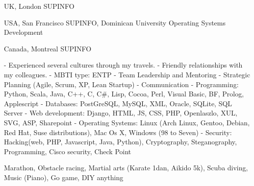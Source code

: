\documentclass[english]{ecv}
\makeatletter
\renewcommand{\ecvBSec}[2][\ecv@lang]{%
  \ifthenelse{\equal{#1}{\ecv@lang}}{%
    \tabularnewline%
    \ecvLeft{\textsc{\Large{\textcolor{ecv@ColBlue}{#2}}} \medskip } &%
    \tabularnewline%
  }{}%
}
\makeatother
\begin{document}
\begin{ecv}
 {UK, London}
                {SUPINFO}

 {USA, San Francisco}
                {SUPINFO, Dominican University}
                {Operating Systems Development}

 {Canada, Montreal}
                {SUPINFO}

\ecvBSec{\hypertarget{hypertarget:\ecvAbilities}{\ecvAbilities}}
                { - Experienced several cultures through my travels.\ecvNewLine
                  - Friendly relationships with my colleagues.\ecvNewLine
                  - MBTI type: ENTP\ecvNewLine
                }
                {- Team Leadership and Mentoring
                 - Strategic Planning (Agile, Scrum, XP, Lean Startup)
                 - Communication
                }
                {- Programming: Python, Scala, Java, C++, C, C\#, Lisp, Cocoa,
                  Perl, Visual Basic, BF, Prolog, Applescript\ecvNewLine
                 - Databases: PostGreSQL, MySQL, XML, Oracle, SQLite, SQL
                 Server\ecvNewLine
                 - Web development: Django, HTML, JS, CSS, PHP, Openlaszlo, XUL,
                 SVG, ASP, Sharepoint\ecvNewLine
                 - Operating Systems: Linux (Arch Linux, Gentoo, Debian, Red
                 Hat, Suse distributions), Mac Os X, Windows (98 to Seven)\ecvNewLine
                 - Security: Hacking(web, PHP, Javascript, Java, Python),
                 Cryptography, Steganography, Programming, Cisco security, Check Point}

                {
                    Marathon, Obstacle racing, Martial arts (Karate 1dan, Aikido 5k),
                    Scuba diving,  Music (Piano), Go game, DIY anything
                }



\end{ecv}

\end{document}
